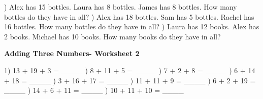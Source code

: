 \documentclass{article}%
\begin{document}
) Alex has 15 bottles. Laura has 8 bottles. James has 8 bottles. How many bottles do they have in all?%
\newline%
\newline%
) Alex has 18 bottles. Sam has 5 bottles. Rachel has 16 bottles. How many bottles do they have in all?%
\newline%
\newline%
) Laura has 12 books. Alex has 2 books. Michael has 10 books. How many books do they have in all?%
\newline%
\newline%
\newline%
\pagebreak%
\large%
\begin{center}%
\textbf{Adding Three Numbers- Worksheet 2}%
\newline%
\newline%
\newline%
\end{center} \normalsize%
1) 13 + 19 + 3 = \_\_\_\_%
\newline%
\newline%
) 8 + 11 + 5 = \_\_\_\_%
\newline%
\newline%
) 7 + 2 + 8 = \_\_\_\_%
\newline%
\newline%
) 6 + 14 + 18 = \_\_\_\_%
\newline%
\newline%
) 3 + 16 + 17 = \_\_\_\_%
\newline%
\newline%
) 11 + 11 + 9 = \_\_\_\_%
\newline%
\newline%
) 6 + 2 + 19 = \_\_\_\_%
\newline%
\newline%
) 14 + 6 + 11 = \_\_\_\_%
\newline%
\newline%
) 10 + 11 + 10 = \_\_\_\_%
\newline%
\end{document}
